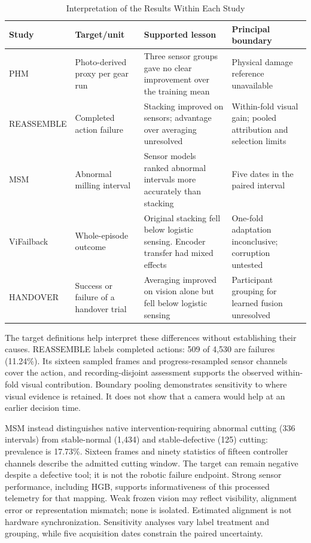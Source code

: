 \begin{table}[htbp]
\caption{Interpretation of the Results Within Each Study}\label{tab:cross-study}
\centering\small

\begin{tabularx}{\textwidth}{P{27mm}YYY}
\toprule Study & Target/unit & Supported lesson & Principal boundary\\\midrule
PHM & Photo-derived proxy per gear run & Three sensor groups gave no clear improvement over the training mean & Physical damage reference unavailable\\
REASSEMBLE & Completed action failure & Stacking improved on sensors; advantage over averaging unresolved & Within-fold visual gain; pooled attribution and selection limits\\
MSM & Abnormal milling interval & Sensor models ranked abnormal intervals more accurately than stacking & Five dates in the paired interval\\
ViFailback & Whole-episode outcome & Original stacking fell below logistic sensing. Encoder transfer had mixed effects & One-fold adaptation inconclusive; corruption untested\\
HANDOVER & Success or failure of a handover trial & Averaging improved on vision alone but fell below logistic sensing & Participant grouping for learned fusion unresolved\\\bottomrule
\end{tabularx}
\end{table}

The target definitions help interpret these differences without establishing their causes. REASSEMBLE labels completed actions: 509 of 4,530 are failures (11.24\%). Its sixteen sampled frames and progress-resampled sensor channels cover the action, and recording-disjoint assessment supports the observed within-fold visual contribution. Boundary pooling demonstrates sensitivity to where visual evidence is retained. It does not show that a camera would help at an earlier decision time.

MSM instead distinguishes native intervention-requiring abnormal cutting (336 intervals) from stable-normal (1,434) and stable-defective (125) cutting: prevalence is 17.73\%. Sixteen frames and ninety statistics of fifteen controller channels describe the admitted cutting window. The target can remain negative despite a defective tool; it is not the robotic failure endpoint. Strong sensor performance, including HGB, supports informativeness of this processed telemetry for that mapping. Weak frozen vision may reflect visibility, alignment error or representation mismatch; none is isolated. Estimated alignment is not hardware synchronization. Sensitivity analyses vary label treatment and grouping, while five acquisition dates constrain the paired uncertainty.

